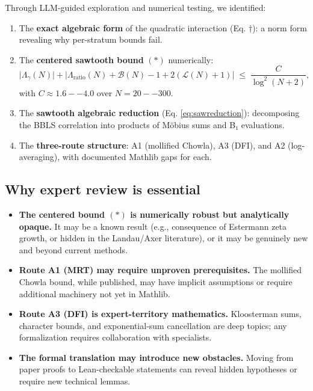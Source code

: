 \documentclass[11pt,a4paper]{article}
\begin{document}
Through LLM-guided exploration and numerical testing, we identified:

\begin{enumerate}
\item The \textbf{exact algebraic form} of the quadratic interaction (Eq. $\dagger$): a norm form revealing why per-stratum bounds fail.
\item The \textbf{centered sawtooth bound} $(\ast)$ numerically:
\[
\bigl|\Lambda_\gamma(N)\bigr|
+\bigl|\Lambda_{\mathrm{ratio}}(N)+\mathcal B(N)-1+2(\mathcal L(N)+1)\bigr|
\;\le\;\frac{C}{\log^2(N{+}2)},
\]
with $C \approx 1.6--4.0$ over $N = 20--300$.
\item The \textbf{sawtooth algebraic reduction} (Eq. \ref{eq:sawreduction}): decomposing the BBLS correlation into products of Möbius sums and B₁ evaluations.
\item The \textbf{three-route structure}: A1 (mollified Chowla), A3 (DFI), and A2 (log-averaging), with documented Mathlib gaps for each.
\end{enumerate}

\subsection{Why expert review is essential}

\begin{itemize}
\item \textbf{The centered bound $(\ast)$ is numerically robust but analytically opaque.} It may be a known result (e.g., consequence of Estermann zeta growth, or hidden in the Landau/Axer literature), or it may be genuinely new and beyond current methods.

\item \textbf{Route A1 (MRT) may require unproven prerequisites.} The mollified Chowla bound, while published, may have implicit assumptions or require additional machinery not yet in Mathlib.

\item \textbf{Route A3 (DFI) is expert-territory mathematics.} Kloosterman sums, character bounds, and exponential-sum cancellation are deep topics; any formalization requires collaboration with specialists.

\item \textbf{The formal translation may introduce new obstacles.} Moving from paper proofs to Lean-checkable statements can reveal hidden hypotheses or require new technical lemmas.
\end{itemize}
\end{document}
